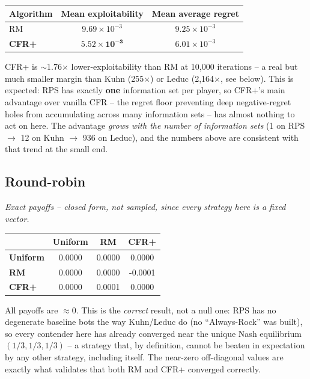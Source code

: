 \documentclass[11pt]{article}
\newcommand{\highlight}[1]{\textbf{#1}}
\begin{document}
\begin{center}
\begin{tabular}{lcc}
\toprule
Algorithm & Mean exploitability & Mean average regret \\
\midrule
RM & $9.69\times10^{-3}$ & $9.25\times10^{-3}$ \\
\highlight{CFR+} & $\mathbf{5.52\times10^{-3}}$ & $6.01\times10^{-3}$ \\
\bottomrule
\end{tabular}
\end{center}

CFR+ is $\sim$1.76$\times$ lower-exploitability than RM at 10{,}000 iterations -- a
real but much smaller margin than Kuhn (255$\times$) or Leduc (2{,}164$\times$, see
below). This is expected: RPS has exactly \highlight{one} information set per
player, so CFR+'s main advantage over vanilla CFR -- the regret floor preventing deep
negative-regret holes from accumulating across many information sets -- has almost
nothing to act on here. The advantage \emph{grows with the number of information
sets} (1 on RPS $\rightarrow$ 12 on Kuhn $\rightarrow$ 936 on Leduc), and the numbers
above are consistent with that trend at the small end.

\subsection*{Round-robin}
\emph{Exact payoffs -- closed form, not sampled, since every strategy here is a fixed
vector.}

\begin{center}
\begin{tabular}{lccc}
\toprule
 & Uniform & RM & CFR+ \\
\midrule
\textbf{Uniform} & 0.0000 & 0.0000 & 0.0000 \\
\textbf{RM} & 0.0000 & 0.0000 & -0.0001 \\
\textbf{CFR+} & 0.0000 & 0.0001 & 0.0000 \\
\bottomrule
\end{tabular}
\end{center}

All payoffs are $\approx 0$. This is the \emph{correct} result, not a null one: RPS
has no degenerate baseline bots the way Kuhn/Leduc do (no ``Always-Rock'' was built),
so every contender here has already converged near the unique Nash equilibrium
$(1/3, 1/3, 1/3)$ -- a strategy that, by definition, cannot be beaten in expectation by
any other strategy, including itself. The near-zero off-diagonal values are exactly
what validates that both RM and CFR+ converged correctly.
\end{document}
